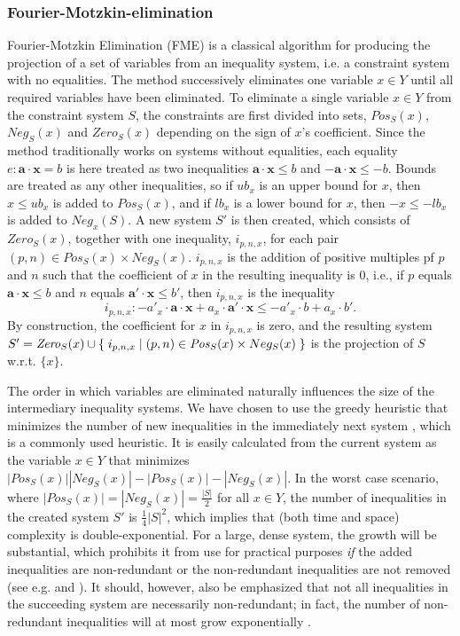 \documentclass[citeauthoryear]{llncs}
\newcommand{\Pos}{\mathit{Pos}}
\newcommand{\Neg}{\mathit{Neg}}
\newcommand{\mi}{\mathit}
\newcommand{\ve}{\mathbf}
\newcommand{\set}[2]{\{\;{#1}\;|\;{#2}\;\}}
\begin{document}
\subsubsection{Fourier-Motzkin-elimination} 
Fourier-Motzkin Elimination (FME) is a classical algorithm for producing the projection of a set of variables from an inequality system, i.e. a constraint system with no equalities. The method successively eliminates one variable $x\in Y$ until all required variables have been eliminated. To eliminate a single variable $x\in Y$ from the constraint system $S$, the constraints are first divided into sets, $\Pos_S(x)$, $\Neg_S(x)$ and $\mi{Zero}_S(x)$ depending on the sign of $x$'s coefficient. Since the method traditionally works on systems without equalities, each equality $e: \ve{a}\cdot\ve{x} = b$ is here treated as two inequalities $\ve{a}\cdot\ve{x} \leq b$ and $-\ve{a}\cdot\ve{x} \leq -b$. Bounds are treated as any other inequalities, so if $ub_x$ is an upper bound for $x$, then $x\leq ub_x$ is added to $\Pos_S(x)$, and if $lb_x$ is a lower bound for $x$, then $-x\leq - lb_x$ is added to $\Neg_x(S)$. A new system $S'$ is then created, which consists of $\mi{Zero}_S(x)$, together with one inequality, $i_{p,n,x}$, for each pair $(p,n)\in \Pos_S(x)\times \Neg_S(x)$. $i_{p,n,x}$ is the addition of positive multiples pf $p$ and $n$ such that the coefficient of $x$ in the resulting inequality is $0$, i.e., if $p$ equals $\ve{a}\cdot\ve{x} \leq b$ and $n$ equals $\ve{a}'\cdot\ve{x} \leq b'$, then $i_{p,n,x}$ is the inequality 
\[
i_{p,n,x}: -a'_x\cdot \ve{a}\cdot\ve{x} + a_x\cdot \ve{a}'\cdot\ve{x} \leq -a'_x\cdot b + a_x\cdot b'.
\]
By construction, the coefficient for $x$ in $i_{p,n,x}$ is zero, and the resulting system $S' = \mi{Zero}_S(x) \cup\\
\set{i_{p,n,x}}{(p,n)\in \Pos_S(x)\times Neg_S(x)}$ is the projection of $S$ w.r.t. $\{x\}$.  

The order in which variables are eliminated naturally influences the size of the intermediary inequality systems. We have chosen to use the greedy heuristic {that minimizes the number of new inequalities in the immediately next system \cite{duffin74}}, which is a commonly used heuristic. It is easily calculated from the current system as the variable $x\in Y$ that minimizes $|\Pos_S(x)||\Neg_S(x)| - |\Pos_S(x)|-|\Neg_S(x)|$.  In the worst case scenario, where $|\Pos_S(x)| = |\Neg_S(x)| = \frac{|S|}{2}$ for all $x\in Y$, the number of inequalities in the created system $S'$ is $\frac{1}{4}|S|^2$, which implies that (both time and space) complexity is double-exponential. For a large, dense system, the growth will be substantial, which prohibits it from use for practical purposes \emph{if} the added inequalities are non-redundant or the non-redundant inequalities are not removed ({see e.g. \cite{lassez93} and \cite{lukatskii08}}). It should, however, also be emphasized that not all inequalities in the succeeding system are necessarily non-redundant; in fact, the number of non-redundant inequalities will at most grow exponentially \cite{monniaux10}.
\end{document}
